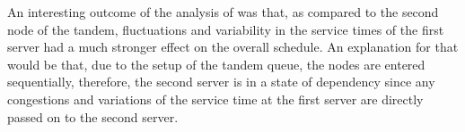 \documentclass[11pt,a4paper]{article}
\begin{document}
\begin{spacing}{1.8}
 An interesting outcome of the analysis of \citet{Kuiper2015} was that, as compared to the second node of the tandem, fluctuations and  variability in the service times of the first server had a  much stronger effect on the overall schedule. An explanation for that would be that, due to the setup of the tandem queue, the nodes are entered sequentially, therefore, the second server is in a state of dependency 
since any congestions and variations of the service time at the first server are directly passed on to the second server.



\end{spacing}
\end{document}
